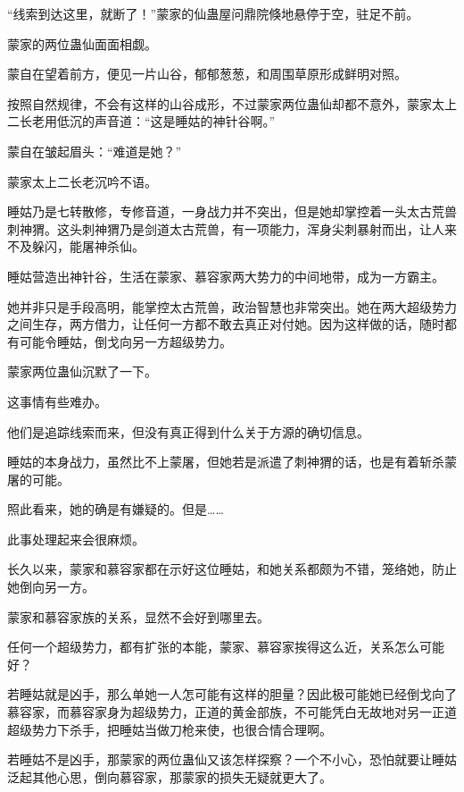 
\begin{this_body}



“线索到达这里，就断了！”蒙家的仙蛊屋问鼎院倏地悬停于空，驻足不前。

蒙家的两位蛊仙面面相觑。

蒙自在望着前方，便见一片山谷，郁郁葱葱，和周围草原形成鲜明对照。

按照自然规律，不会有这样的山谷成形，不过蒙家两位蛊仙却都不意外，蒙家太上二长老用低沉的声音道：“这是睡姑的神针谷啊。”

蒙自在皱起眉头：“难道是她？”

蒙家太上二长老沉吟不语。

睡姑乃是七转散修，专修音道，一身战力并不突出，但是她却掌控着一头太古荒兽刺神猬。这头刺神猬乃是剑道太古荒兽，有一项能力，浑身尖刺暴射而出，让人来不及躲闪，能屠神杀仙。

睡姑营造出神针谷，生活在蒙家、慕容家两大势力的中间地带，成为一方霸主。

她并非只是手段高明，能掌控太古荒兽，政治智慧也非常突出。她在两大超级势力之间生存，两方借力，让任何一方都不敢去真正对付她。因为这样做的话，随时都有可能令睡姑，倒戈向另一方超级势力。

蒙家两位蛊仙沉默了一下。

这事情有些难办。

他们是追踪线索而来，但没有真正得到什么关于方源的确切信息。

睡姑的本身战力，虽然比不上蒙屠，但她若是派遣了刺神猬的话，也是有着斩杀蒙屠的可能。

照此看来，她的确是有嫌疑的。但是……

此事处理起来会很麻烦。

长久以来，蒙家和慕容家都在示好这位睡姑，和她关系都颇为不错，笼络她，防止她倒向另一方。

蒙家和慕容家族的关系，显然不会好到哪里去。

任何一个超级势力，都有扩张的本能，蒙家、慕容家挨得这么近，关系怎么可能好？

若睡姑就是凶手，那么单她一人怎可能有这样的胆量？因此极可能她已经倒戈向了慕容家，而慕容家身为超级势力，正道的黄金部族，不可能凭白无故地对另一正道超级势力下杀手，把睡姑当做刀枪来使，也很合情合理啊。

若睡姑不是凶手，那蒙家的两位蛊仙又该怎样探察？一个不小心，恐怕就要让睡姑泛起其他心思，倒向慕容家，那蒙家的损失无疑就更大了。


\end{this_body}
